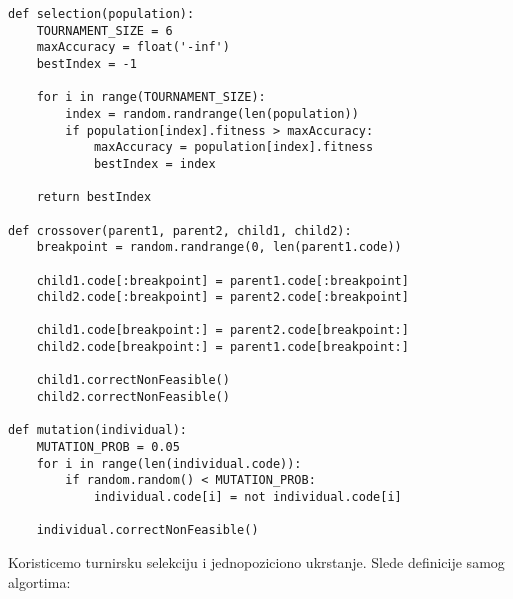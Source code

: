 \documentclass[11pt]{article} %
\begin{document}
\begin{lstlisting}
def selection(population):
    TOURNAMENT_SIZE = 6
    maxAccuracy = float('-inf')
    bestIndex = -1
    
    for i in range(TOURNAMENT_SIZE):
        index = random.randrange(len(population))
        if population[index].fitness > maxAccuracy:
            maxAccuracy = population[index].fitness
            bestIndex = index
    
    return bestIndex
    
def crossover(parent1, parent2, child1, child2):
    breakpoint = random.randrange(0, len(parent1.code))
    
    child1.code[:breakpoint] = parent1.code[:breakpoint]
    child2.code[:breakpoint] = parent2.code[:breakpoint]
    
    child1.code[breakpoint:] = parent2.code[breakpoint:]
    child2.code[breakpoint:] = parent1.code[breakpoint:]
    
    child1.correctNonFeasible()
    child2.correctNonFeasible()
    
def mutation(individual):
    MUTATION_PROB = 0.05
    for i in range(len(individual.code)):
        if random.random() < MUTATION_PROB:
            individual.code[i] = not individual.code[i]
            
    individual.correctNonFeasible()
\end{lstlisting}

Koristicemo turnirsku selekciju i jednopoziciono ukrstanje. Slede definicije samog algortima:
\end{document}
